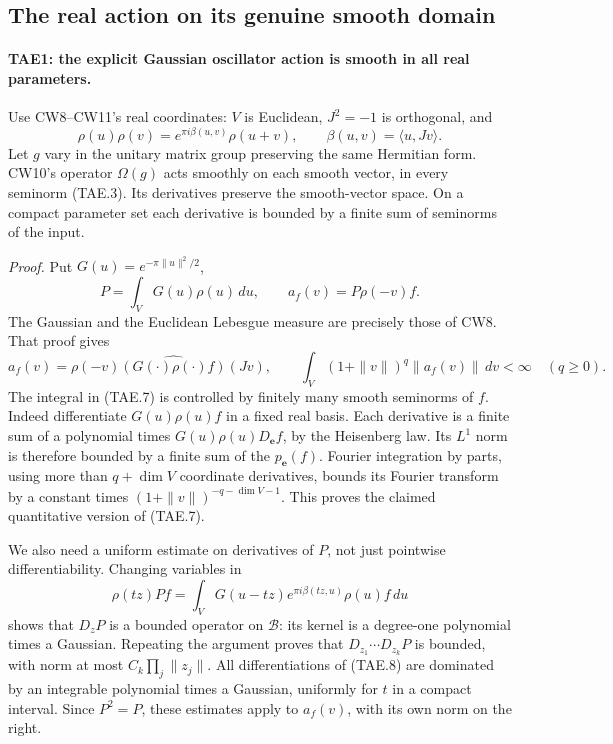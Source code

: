 \subsection*{The real action on its genuine smooth domain}

\paragraph{TAE1: the explicit Gaussian oscillator action is smooth in all real parameters.}
\label{claim:TAE1}
Use CW8--CW11's real coordinates: \(V\) is Euclidean,
\(J^2=-1\) is orthogonal, and
\[
 \rho(u)\rho(v)=e^{\pi i\beta(u,v)}\rho(u+v),
 \qquad \beta(u,v)=\langle u,Jv\rangle .
 \tag{TAE.5}
\]
Let \(g\) vary in the unitary matrix group preserving the same
Hermitian form.  CW10's operator
\(\Omega(g)\) acts smoothly on each smooth vector, in every seminorm
(TAE.3).  Its derivatives preserve the smooth-vector space.  On a
compact parameter set each derivative is bounded by a finite sum of
seminorms of the input.

\emph{Proof.}
Put \(G(u)=e^{-\pi\|u\|^2/2}\),
\[
 P=\int_VG(u)\rho(u)\,du,\qquad
 a_f(v)=P\rho(-v)f .
 \tag{TAE.6}
\]
The Gaussian and the Euclidean Lebesgue measure are precisely those
of CW8.  That proof gives
\[
 a_f(v)=\rho(-v)\widehat{(G(\cdot)\rho(\cdot)f)}(Jv),
 \qquad
 \int_V(1+\|v\|)^q\|a_f(v)\|\,dv<\infty
 \quad(q\ge0).
 \tag{TAE.7}
\]
The integral in (TAE.7) is controlled by finitely many smooth
seminorms of \(f\).  Indeed differentiate
\(G(u)\rho(u)f\) in a fixed real basis.  Each derivative is a finite
sum of a polynomial times \(G(u)\rho(u)D_{\mathbf e}f\), by the
Heisenberg law.  Its \(L^1\) norm is therefore bounded by a finite
sum of the \(p_{\mathbf e}(f)\).  Fourier integration by parts,
using more than \(q+\dim V\) coordinate derivatives, bounds its
Fourier transform by a constant times
\((1+\|v\|)^{-q-\dim V-1}\).  This proves the claimed quantitative
version of (TAE.7).

We also need a uniform estimate on derivatives of \(P\), not just
pointwise differentiability.  Changing variables in
\[
 \rho(tz)Pf
  =\int_VG(u-tz)e^{\pi i\beta(tz,u)}\rho(u)f\,du
 \tag{TAE.8}
\]
shows that \(D_zP\) is a bounded operator on \(\mathcal B\):
its kernel is a degree-one polynomial times a Gaussian.
Repeating the argument proves that
\(D_{z_1}\cdots D_{z_k}P\) is bounded, with norm at most
\(C_k\prod_j\|z_j\|\).  All differentiations of (TAE.8) are
dominated by an integrable polynomial times a Gaussian, uniformly
for \(t\) in a compact interval.  Since \(P^2=P\), these estimates
apply to \(a_f(v)\), with its own norm on the right.

